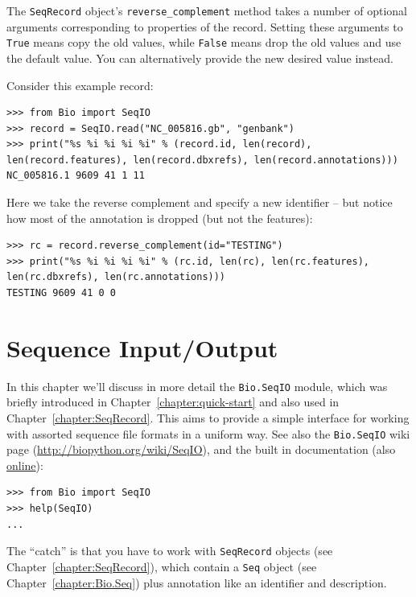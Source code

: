 \documentclass{report}
\begin{document}
The \verb|SeqRecord| object's \verb|reverse_complement| method takes a number
of optional arguments corresponding to properties of the record. Setting these
arguments to \verb|True| means copy the old values, while \verb|False| means
drop the old values and use the default value. You can alternatively provide
the new desired value instead.

Consider this example record:

\begin{verbatim}
>>> from Bio import SeqIO
>>> record = SeqIO.read("NC_005816.gb", "genbank")
>>> print("%s %i %i %i %i" % (record.id, len(record), len(record.features), len(record.dbxrefs), len(record.annotations)))
NC_005816.1 9609 41 1 11
\end{verbatim}

Here we take the reverse complement and specify a new identifier -- but notice
how most of the annotation is dropped (but not the features):

\begin{verbatim}
>>> rc = record.reverse_complement(id="TESTING")
>>> print("%s %i %i %i %i" % (rc.id, len(rc), len(rc.features), len(rc.dbxrefs), len(rc.annotations)))
TESTING 9609 41 0 0
\end{verbatim}

\chapter{Sequence Input/Output}
\label{chapter:Bio.SeqIO}

In this chapter we'll discuss in more detail the \verb|Bio.SeqIO| module, which was briefly introduced in Chapter~\ref{chapter:quick-start} and also used in Chapter~\ref{chapter:SeqRecord}. This aims to provide a simple interface for working with assorted sequence file formats in a uniform way.
See also the \verb|Bio.SeqIO| wiki page (\url{http://biopython.org/wiki/SeqIO}), and the built in documentation (also \href{http://biopython.org/DIST/docs/api/Bio.SeqIO-module.html}{online}):

\begin{verbatim}
>>> from Bio import SeqIO
>>> help(SeqIO)
...
\end{verbatim}

The ``catch'' is that you have to work with \verb|SeqRecord| objects (see Chapter~\ref{chapter:SeqRecord}), which contain a \verb|Seq| object (see Chapter~\ref{chapter:Bio.Seq}) plus annotation like an identifier and description.
\end{document}

